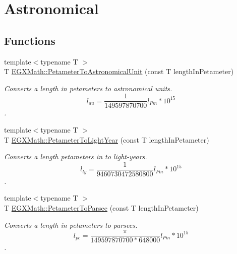 \hypertarget{group___e_g_x_math-_conversions-_length_conversions-_petameter-_astronomical}{}\section{Astronomical}
\label{group___e_g_x_math-_conversions-_length_conversions-_petameter-_astronomical}
\subsection*{Functions}
\begin{DoxyCompactItemize}
\item 
{\footnotesize template$<$typename T $>$ }\\T \mbox{\hyperlink{group___e_g_x_math-_conversions-_length_conversions-_petameter-_astronomical_ga8d28d4fb81bdbac19c416be69973fcf9}{E\+G\+X\+Math\+::\+Petameter\+To\+Astronomical\+Unit}} (const T length\+In\+Petameter)
\begin{DoxyCompactList}\small\item\em Converts a length in petameters to astronomical units. \[ l_{au}= \frac{1}{149597870700} l_{Pm} * 10^{15} \]. \end{DoxyCompactList}\item 
{\footnotesize template$<$typename T $>$ }\\T \mbox{\hyperlink{group___e_g_x_math-_conversions-_length_conversions-_petameter-_astronomical_gaea87071d89d0f8dbb3b4df023587b82f}{E\+G\+X\+Math\+::\+Petameter\+To\+Light\+Year}} (const T length\+In\+Petameter)
\begin{DoxyCompactList}\small\item\em Converts a length petameters in to light-\/years. \[ l_{ly}= \frac{1}{9460730472580800} l_{Pm} * 10^{15} \]. \end{DoxyCompactList}\item 
{\footnotesize template$<$typename T $>$ }\\T \mbox{\hyperlink{group___e_g_x_math-_conversions-_length_conversions-_petameter-_astronomical_ga6579583b24214c285978b0e08e163a9d}{E\+G\+X\+Math\+::\+Petameter\+To\+Parsec}} (const T length\+In\+Petameter)
\begin{DoxyCompactList}\small\item\em Converts a length in petameters to parsecs. \[ l_{pc}=\frac{\pi}{149597870700 * 648000} l_{Pm} * 10^{15} \]. \end{DoxyCompactList}\end{DoxyCompactItemize}


